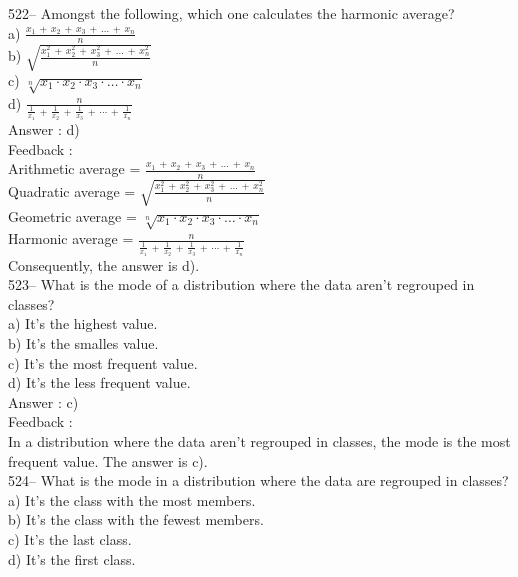 \documentclass[letterpaper, 12pt]{article}
\begin{document}
522-- Amongst the following, which one calculates the harmonic average?\\
a) $\frac{x_1\,+\,x_2\,+\,x_3\,+\,\ldots\,+\,x_n}{n}$\\[2mm]
b)
$\sqrt{\frac{x_1^{2}\,+\,x_2^{2}\,+\,x_3^{2}\,+\,\ldots\,+\,x_n^{2}}{n}}$\\[2mm]
c) $\sqrt[n]{x_1 \cdot x_2 \cdot x_3 \cdot \ldots \cdot x_n}$\\[2mm]
d)
$\frac{n}{\frac{1}{x_1}\,+\,\frac{1}{x_2}\,+\,\frac{1}{x_3}\,+\,\cdots\,+\,\frac{1}{x_n}}$\\

Answer : d)\\

Feedback : \\
Arithmetic average =
$\frac{x_1\,+\,x_2\,+\,x_3\,+\,\ldots\,+\,x_n}{n}$\\[2mm]
Quadratic average =
$\sqrt{\frac{x_1^{2}\,+\,x_2^{2}\,+\,x_3^{2}\,+\,\ldots\,+\,x_n^{2}}{n}}$\\[2mm]
Geometric average = $\sqrt[n]{x_1\cdot x_2\cdot x_3 \cdot \ldots \cdot
x_n}$\\[2mm]
Harmonic average =
$\frac{n}{\frac{1}{x_1}\,+\,\frac{1}{x_2}\,+\,\frac{1}{x_3}\,+\,\cdots\,+\,\frac{1}{x_n}}$\\[2mm]
Consequently, the answer is d).\\

523-- What is the mode of a distribution where the data aren't regrouped in classes?\\
a) It's the highest value.\\
b) It's the smalles value.\\
c) It's the most frequent value.\\
d) It's the less frequent value.\\

Answer : c)\\

Feedback : \\
In a distribution where the data aren't regrouped in classes, the mode is the most frequent value.  The answer is c).\\

524-- What is the mode in a distribution where the data are regrouped in classes?\\
a) It's the class with the most members.\\
b) It's the class with the fewest members.\\
c) It's the last class.\\
d) It's the first class.\\
\end{document}
